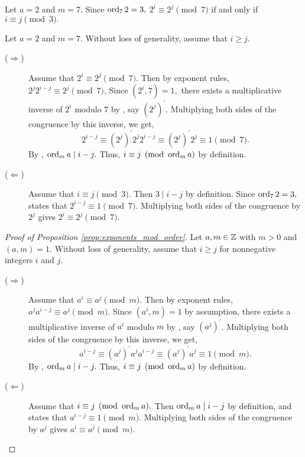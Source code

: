 \documentclass{ximera}
\begin{document}
\begin{example}
    Let $a=2$ and $m=7.$ Since $\operatorname{ord}_7 2=3,$ $2^i\equiv 2^j\pmod{7}$ if and only if $i\equiv j\pmod{3}.$


    \begin{sketch}
        Let $a=2$ and $m=7.$ Without loss of generality, assume that $i\geq j.$ 

        \begin{description}
            \item[($\Rightarrow$)] Assume that $2^i\equiv 2^j\pmod{7}.$ Then by exponent rules, $2^j 2^{i-j}\equiv 2^j\pmod{7}.$ Since $(2^i,7)=1,$ there exists a multiplicative inverse of $2^i$ modulo $7$ by , say $(2^j)^\prime$. Multiplying both sides of the congruence by this inverse, we get, \[2^{i-j}\equiv (2^j)^\prime 2^j 2^{i-j}\equiv (2^j)^\prime 2^j\equiv 1\pmod{7}.\]
            By , $\operatorname{ord}_m a\mid i-j.$ Thus, $i\equiv j\pmod{\operatorname{ord}_m a}$ by definition.

            \item[($\Leftarrow$)] Assume that $i\equiv j\pmod{3}.$ Then $3\mid i-j$ by definition. Since $\operatorname{ord}_7 2=3,$  states that $2^{i-j}\equiv 1\pmod{7}.$ Multiplying both sides of the congruence by $2^j$ gives $2^i\equiv 2^j\pmod{7}.$ 
        \end{description}
    \end{sketch}
\end{example}


\begin{proof}[Proof of Proposition \autoref{prop:exponents_mod_order}]
    Let $a,m\in\mathbb Z$ with $m>0$ and $(a,m)=1.$ Without loss of generality, assume that $i\geq j$ for nonnegative integers $i$ and $j.$ 

        \begin{description}
            \item[($\Rightarrow$)] Assume that $a^i\equiv a^j\pmod{m}.$ Then by exponent rules, $a^j a^{i-j}\equiv a^j\pmod{m}.$ Since $(a^i,m)=1$ by assumption, there exists a multiplicative inverse of $a^i$ modulo $m$ by , say $(a^j)^\prime$. Multiplying both sides of the congruence by this inverse, we get, \[a^{i-j}\equiv (a^j)^\prime a^j a^{i-j}\equiv (a^j)^\prime a^j\equiv 1\pmod{m}.\]
            By , $\operatorname{ord}_m a\mid i-j.$ Thus, $i\equiv j\pmod{\operatorname{ord}_m a}$ by definition.

            \item[($\Leftarrow$)] Assume that $i\equiv j\pmod{\operatorname{ord}_m a}.$ Then $\operatorname{ord}_m a\mid i-j$ by definition, and  states that $a^{i-j}\equiv 1\pmod{m}.$ Multiplying both sides of the congruence by $a^j$ gives $a^i\equiv a^j\pmod{m}.$ 
        \end{description}
\end{proof}

\end{document}
